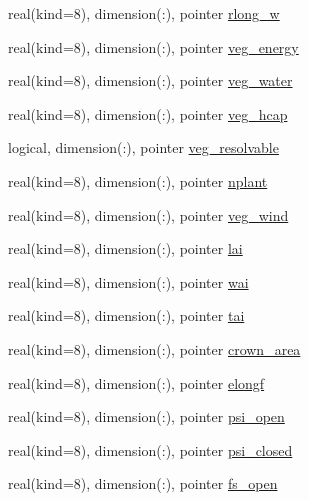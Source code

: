 \begin{DoxyCompactItemize}
\item 
real(kind=8), dimension(\+:), pointer \hyperlink{structrk4__coms_1_1rk4patchtype_ad07c1f3137aeb62f18b2f11d1fd1072a}{rlong\+\_\+w}
\item 
real(kind=8), dimension(\+:), pointer \hyperlink{structrk4__coms_1_1rk4patchtype_a3e942be71018a4068883ca31ebb4ed02}{veg\+\_\+energy}
\item 
real(kind=8), dimension(\+:), pointer \hyperlink{structrk4__coms_1_1rk4patchtype_a1296b8fd601c87529f51088f2fef705e}{veg\+\_\+water}
\item 
real(kind=8), dimension(\+:), pointer \hyperlink{structrk4__coms_1_1rk4patchtype_a1341dfb97a9ea1fb516ea386eefff105}{veg\+\_\+hcap}
\item 
logical, dimension(\+:), pointer \hyperlink{structrk4__coms_1_1rk4patchtype_a646adef70872d67b500e084e2da9ba29}{veg\+\_\+resolvable}
\item 
real(kind=8), dimension(\+:), pointer \hyperlink{structrk4__coms_1_1rk4patchtype_a661699f433b34be7705a6ba92f695bcc}{nplant}
\item 
real(kind=8), dimension(\+:), pointer \hyperlink{structrk4__coms_1_1rk4patchtype_a7ff27fa03dd3d519ba57b7ff8e04540b}{veg\+\_\+wind}
\item 
real(kind=8), dimension(\+:), pointer \hyperlink{structrk4__coms_1_1rk4patchtype_a501e9acb39a2e5bf2421083783dabc37}{lai}
\item 
real(kind=8), dimension(\+:), pointer \hyperlink{structrk4__coms_1_1rk4patchtype_a3e6e2c23b52a05c394a39b8c36bc1109}{wai}
\item 
real(kind=8), dimension(\+:), pointer \hyperlink{structrk4__coms_1_1rk4patchtype_a523808c2c1d428e2467f48654a44217a}{tai}
\item 
real(kind=8), dimension(\+:), pointer \hyperlink{structrk4__coms_1_1rk4patchtype_aac5a4cfb4442cf696318cbb650a44051}{crown\+\_\+area}
\item 
real(kind=8), dimension(\+:), pointer \hyperlink{structrk4__coms_1_1rk4patchtype_a2f3ac987884f3ba5d1a23492ed791282}{elongf}
\item 
real(kind=8), dimension(\+:), pointer \hyperlink{structrk4__coms_1_1rk4patchtype_ac7c8aaf06bdf652c4f7283a3bbb20af9}{psi\+\_\+open}
\item 
real(kind=8), dimension(\+:), pointer \hyperlink{structrk4__coms_1_1rk4patchtype_ad6df5d6c4e2c694d9e6ee406f99b7bb0}{psi\+\_\+closed}
\item 
real(kind=8), dimension(\+:), pointer \hyperlink{structrk4__coms_1_1rk4patchtype_adf7af0feefd4117bb4081ac2b57f8e14}{fs\+\_\+open}

\end{DoxyCompactItemize}
